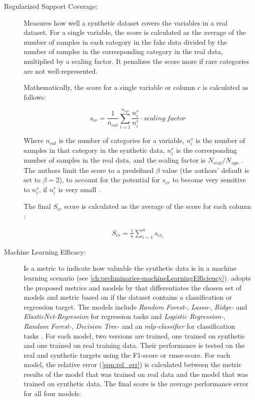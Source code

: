 \begin{description}
  \item[Regularized Support Coverage:]
  Measures how well a synthetic dataset covers the variables in a real dataset. 
  For a single variable, the score is calculated as the average of the number of samples in each category in the fake data 
  divided by the number of samples in the corresponding category in the real data, multiplied by a scaling factor. 
  It penalizes the score more if rare categories are not well-represented. 
  
  Mathematically, the score for a single variable or column $c$ is calculated as follows:

  $$ s_{cr} = \frac{1}{n_{cat}} \sum_{i=1}^{n_{cat}} \frac{n^s_i}{n^r_i} \cdot scaling~factor $$

  Where $n_{cat}$ is the number of categories for a variable, $n^s_i$ is the number of samples in that category in the synthetic data, $n^r_i$ is the corresponding number of samples in the real data, and the scaling factor is $N_{real}/N_{syn}$ \cite{chundawat2022UniversalMetricRobust}.
  The authors limit the score to a predefined $\beta$ value (the authors' default is set to $\beta=2$), to account for the potential for $s_{cr}$ to become very sensitive to $n^s_i$, if $n^r_i$ is very small \cite{chundawat2022UniversalMetricRobust}.

  The final $S_{cr}$ score is calculated as the average of the score for each column \cite{chundawat2022UniversalMetricRobust}:

  \begin{equation}
    \begin{align*}
      \label{eqn:s_cr}
      S_{cr} = \frac{1}{n} \sum_{i=1}^{n} s_{cr_i}
      \end{align*}
  \end{equation}



  \item[Machine Learning Efficacy:]
  Is a metric to indicate how valuable the synthetic data is in a machine learning scenario (see \autoref{ch:preliminaries-machineLearningEfficiency}).
  \cite{chundawat2022UniversalMetricRobust} adopts the proposed metrics and models by \cite{brenninkmeijer2019GenerationEvaluationTabular} that differentiates the chosen set of models and metric based on
  if the dataset contains a classification or regression target.
  The models include \textit{Random Forest-}, \textit{Lasso-}, \textit{Ridge-} and \textit{ElasticNet-Regression} for regression tasks and \textit{Logistic Regression-}, \textit{Random Forest-},  \textit{Decision Tree-} and an \textit{\gls{mlp}-classifier} for classification tasks \cite{brenninkmeijer2019GenerationEvaluationTabular, chundawat2022UniversalMetricRobust}.
  For each model, two versions are trained, one trained on synthetic and one trained on real training data.
  Their performance is tested on the real and synthetic targets using the F1-score or \gls{rmse}-score.
  For each model, the relative error (\autoref{eqn:rel_err}) is calculated between the metric results of the model that was trained on real data and the model that was trained on synthetic data.
  The final score is the average performance error for all four models:


\end{description}
